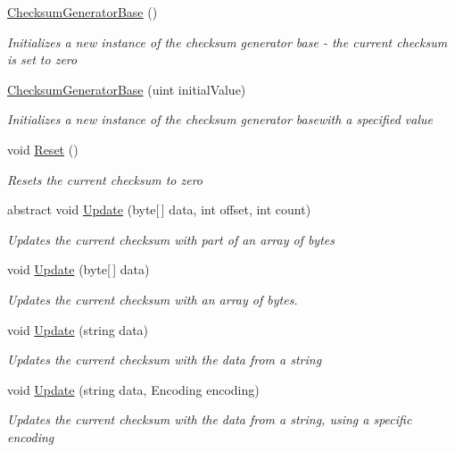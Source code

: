 \begin{DoxyCompactItemize}
\item 
\hyperlink{class_dot_z_lib_1_1_checksum_generator_base_a4c13ec1d2cb08abadffb2c70cb4ba258}{Checksum\+Generator\+Base} ()
\begin{DoxyCompactList}\small\item\em Initializes a new instance of the checksum generator base -\/ the current checksum is set to zero \end{DoxyCompactList}\item 
\hyperlink{class_dot_z_lib_1_1_checksum_generator_base_ab36da84d395361311a45e88797ae8c69}{Checksum\+Generator\+Base} (uint initial\+Value)
\begin{DoxyCompactList}\small\item\em Initializes a new instance of the checksum generator basewith a specified value \end{DoxyCompactList}\item 
void \hyperlink{class_dot_z_lib_1_1_checksum_generator_base_a78ec9de09223c6f9f81e4a32d8d00b70}{Reset} ()
\begin{DoxyCompactList}\small\item\em Resets the current checksum to zero \end{DoxyCompactList}\item 
abstract void \hyperlink{class_dot_z_lib_1_1_checksum_generator_base_a7844da3e1f8af01d7cde34f3056bf24b}{Update} (byte\mbox{[}$\,$\mbox{]} data, int offset, int count)
\begin{DoxyCompactList}\small\item\em Updates the current checksum with part of an array of bytes \end{DoxyCompactList}\item 
void \hyperlink{class_dot_z_lib_1_1_checksum_generator_base_a3fafe3e0c2fa80fb2cbbdce82a76bc84}{Update} (byte\mbox{[}$\,$\mbox{]} data)
\begin{DoxyCompactList}\small\item\em Updates the current checksum with an array of bytes. \end{DoxyCompactList}\item 
void \hyperlink{class_dot_z_lib_1_1_checksum_generator_base_a4f0a5411dbb86714571852000932d66e}{Update} (string data)
\begin{DoxyCompactList}\small\item\em Updates the current checksum with the data from a string \end{DoxyCompactList}\item 
void \hyperlink{class_dot_z_lib_1_1_checksum_generator_base_ad8e1adfbbfcc12ab74c772f3292bfee3}{Update} (string data, Encoding encoding)
\begin{DoxyCompactList}\small\item\em Updates the current checksum with the data from a string, using a specific encoding \end{DoxyCompactList}\end{DoxyCompactItemize}
